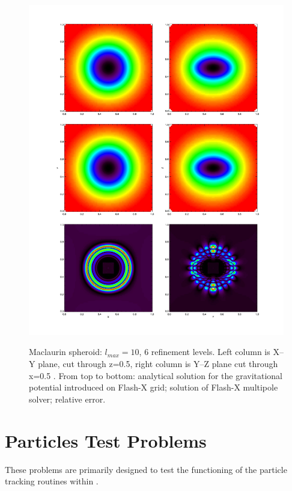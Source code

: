 \begin{figure}
\begin{center}
{\leavevmode\includegraphics[width=140mm]{Maclaurin_mpole10}}
\end{center}
\caption{Maclaurin spheroid: $l_{max} = 10$, 6 refinement levels. Left column is X--Y plane, 
                cut through z=0.5, right column is Y--Z plane cut through x=0.5 .
                From top to bottom: analytical solution for the gravitational potential introduced on 
                Flash-X grid; solution of Flash-X multipole solver; relative error.}
\label{Fig:Maclaurin_mpole10}
\end{figure}



\newpage
\section{Particles Test Problems}
These problems are primarily designed to test the functioning of the
particle tracking routines within \flashx.

